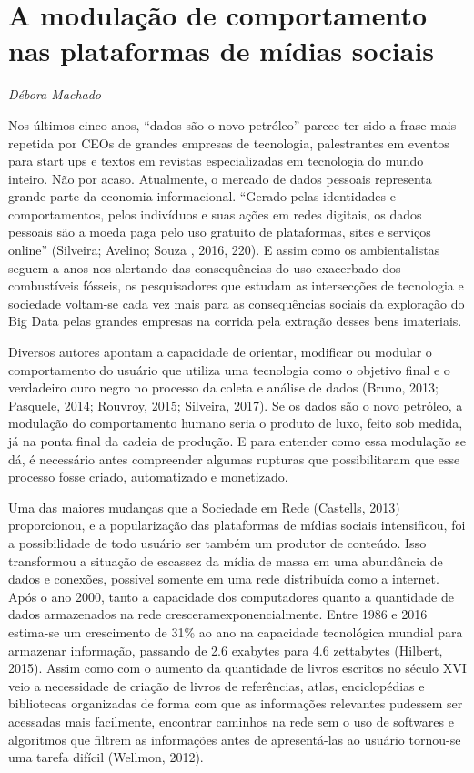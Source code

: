 \chapter{A modulação de comportamento nas plataformas de mídias sociais}

\begin{flushright}
\emph{Débora Machado}
\end{flushright}

Nos últimos cinco anos, ``dados são o novo petróleo'' parece ter sido a
frase mais repetida por CEOs de grandes empresas de tecnologia,
palestrantes em eventos para start ups e textos em revistas
especializadas em tecnologia do mundo inteiro. Não por acaso.
Atualmente, o mercado de dados pessoais representa grande parte da
economia informacional. ``Gerado pelas identidades e comportamentos,
pelos indivíduos e suas ações em redes digitais, os dados pessoais são a
moeda paga pelo uso gratuito de plataformas, sites e serviços online''
(Silveira; Avelino; Souza , 2016, 220). E assim como os ambientalistas
seguem a anos nos alertando das consequências do uso exacerbado dos
combustíveis fósseis, os pesquisadores que estudam as intersecções de
tecnologia e sociedade voltam-se cada vez mais para as consequências
sociais da exploração do Big Data pelas grandes empresas na corrida pela
extração desses bens imateriais.

Diversos autores apontam a capacidade de orientar, modificar ou modular
o comportamento do usuário que utiliza uma tecnologia como o objetivo
final e o verdadeiro ouro negro no processo da coleta e análise de dados
(Bruno, 2013; Pasquele, 2014; Rouvroy, 2015; Silveira, 2017). Se os
dados são o novo petróleo, a modulação do comportamento humano seria o
produto de luxo, feito sob medida, já na ponta final da cadeia de
produção. E para entender como essa modulação se dá, é necessário antes
compreender algumas rupturas que possibilitaram que esse processo fosse
criado, automatizado e monetizado.

Uma das maiores mudanças que a Sociedade em Rede (Castells, 2013)
proporcionou, e a popularização das plataformas de mídias sociais
intensificou, foi a possibilidade de todo usuário ser também um produtor
de conteúdo. Isso transformou a situação de escassez da mídia de massa
em uma abundância de dados e conexões, possível somente em uma rede
distribuída como a internet. Após o ano 2000, tanto a capacidade dos
computadores quanto a quantidade de dados armazenados na rede
cresceramexponencialmente. Entre 1986 e 2016 estima-se um crescimento de
31\% ao ano na capacidade tecnológica mundial para armazenar informação,
passando de 2.6 exabytes para 4.6 zettabytes (Hilbert, 2015). Assim como
com o aumento da quantidade de livros escritos no século XVI veio a
necessidade de criação de livros de referências, atlas, enciclopédias e
bibliotecas organizadas de forma com que as informações relevantes
pudessem ser acessadas mais facilmente, encontrar caminhos na rede sem o
uso de softwares e algoritmos que filtrem as informações antes de
apresentá-las ao usuário tornou-se uma tarefa difícil (Wellmon, 2012).

